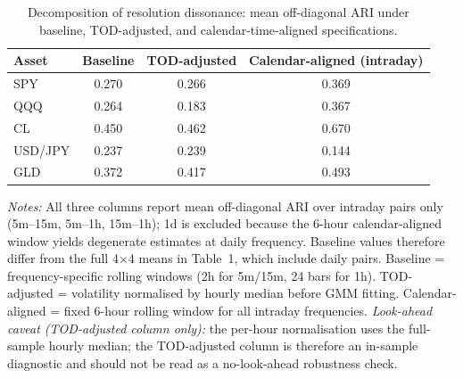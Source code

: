 \documentclass[preprint,12pt,authoryear]{elsarticle}
\begin{document}
\begin{table}[!htbp]
\centering
\small
\setlength{\tabcolsep}{5pt}
\caption{Decomposition of resolution dissonance: mean off-diagonal ARI under baseline, TOD-adjusted, and calendar-time-aligned specifications.}
\label{tab:decomposition}
\begin{tabular}{lccc}
\toprule
Asset & Baseline & TOD-adjusted & Calendar-aligned (intraday) \\
\midrule
SPY & 0.270 & 0.266 & 0.369 \\
QQQ & 0.264 & 0.183 & 0.367 \\
CL & 0.450 & 0.462 & 0.670 \\
USD/JPY & 0.237 & 0.239 & 0.144 \\
GLD & 0.372 & 0.417 & 0.493 \\
\bottomrule
\end{tabular}
\par\medskip
{\footnotesize\justifying
\textit{Notes:} All three columns report mean off-diagonal ARI over intraday pairs only (5m--15m, 5m--1h, 15m--1h); 1d is excluded because the 6-hour calendar-aligned window yields degenerate estimates at daily frequency. Baseline values therefore differ from the full 4$\times$4 means in Table~1, which include daily pairs. Baseline = frequency-specific rolling windows (2h for 5m/15m, 24 bars for 1h). TOD-adjusted = volatility normalised by hourly median before GMM fitting. Calendar-aligned = fixed 6-hour rolling window for all intraday frequencies. \emph{Look-ahead caveat (TOD-adjusted column only):} the per-hour normalisation uses the full-sample hourly median; the TOD-adjusted column is therefore an in-sample diagnostic and should not be read as a no-look-ahead robustness check.
\par}
\end{table}
\end{document}
